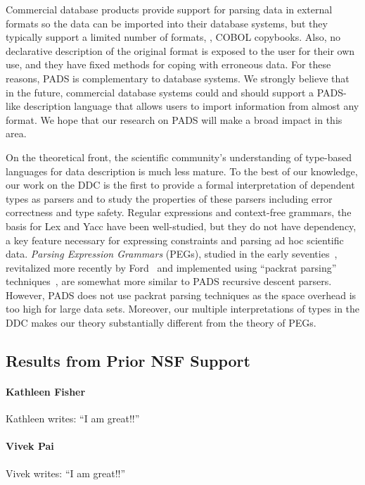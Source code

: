 \documentclass[11pt]{article}
\begin{document}
Commercial database products provide support for
parsing data in external formats so the data can be imported into
their database systems, but they typically support a limited number of
formats, \eg{}, COBOL copybooks.  Also, no declarative description of the
original format is exposed to the user for their own use, and they
have fixed methods for coping with erroneous data.  For these reasons,
PADS is complementary to database systems.  We strongly believe that
in the future, commercial database systems could and should support a 
PADS-like description language that allows users to import information from
almost any format.  We hope that our research on PADS will make a broad
impact in this area.

On the theoretical front, the scientific community's understanding of
type-based languages for data description is much less mature.  To the
best of our knowledge, our work on the DDC is the first to provide a
formal interpretation of dependent types as parsers and to study the
properties of these parsers including error correctness and type
safety.  Regular expressions and context-free grammars, the basis for
Lex and Yacc have been well-studied, but they do not have dependency,
a key feature necessary for expressing constraints and parsing ad hoc
scientific data.  {\em Parsing Expression Grammars} (PEGs), studied in
the early seventies~\cite{birman+:parsing}, revitalized more recently
by Ford~\cite{ford:pegs} and implemented using ``packrat parsing''
techniques~\cite{ford:packrat,grimm:packrat}, are somewhat more
similar to PADS recursive descent parsers. However, PADS does not use
packrat parsing techniques as the space overhead is too high for large
data sets.  Moreover, our multiple interpretations of types
in the DDC makes our theory substantially different from the theory of
PEGs.

\subsection{Results from Prior NSF Support}
\label{ssec:results}

\paragraph*{Kathleen Fisher} Kathleen writes:  ``I am great!!''

\paragraph*{Vivek Pai} Vivek writes:  ``I am great!!''
\end{document}
